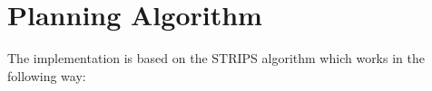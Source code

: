 \section{Planning Algorithm}
\label{sec:PlaniAlg}

The implementation is based on the STRIPS algorithm which works in the following way: